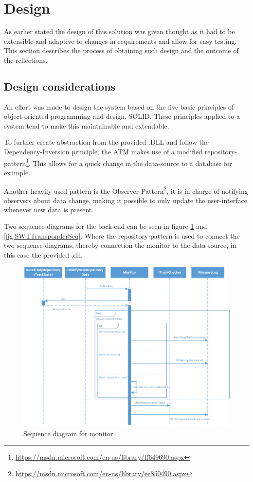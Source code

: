 \section{Design}
As earlier stated the design of this solution was given thought as it had to be extensible and adaptive to changes in requirements and allow for easy testing. This section describes the process of obtaining such design and the outcome of the reflections.

\subsection{Design considerations}
An effort was made to design the system based on the five basic principles of object-oriented programming and design, SOLID. These principles applied to a system tend to make this maintainable and extendable.

To further create abstraction from the provided .DLL and follow the Dependency-Inversion principle, the ATM makes use of a modified repository-pattern\footnote{\url{https://msdn.microsoft.com/en-us/library/ff649690.aspx}}. This allows for a quick change in the data-source to a database for example.

Another heavily used pattern is the Observer Pattern\footnote{\url{https://msdn.microsoft.com/en-us/library/ee850490.aspx}}, it is in charge of notifying observers about data change, making it possible to only update the user-interface whenever new data is present.

Two sequence-diagrams for the back-end can be seen in figure \ref{fig:MonitorSeq} and \ref{fig:SWTTransponderSeq}. Where the repository-pattern is used to connect the two sequence-diagrams, thereby connection the monitor to the data-source, in this case the provided .dll.

\begin{figure}
	\centering
	\includegraphics[width=1.0\linewidth]{Images/MonitorSeq}
	\caption{Sequence diagram for monitor}
	\label{fig:MonitorSeq}
\end{figure}

